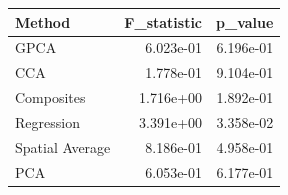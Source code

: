 \begin{tabular}{lrr}
\toprule
Method & F_statistic & p_value \\
\midrule
GPCA & 6.023e-01 & 6.196e-01 \\
CCA & 1.778e-01 & 9.104e-01 \\
Composites & 1.716e+00 & 1.892e-01 \\
Regression & 3.391e+00 & 3.358e-02 \\
Spatial Average & 8.186e-01 & 4.958e-01 \\
PCA & 6.053e-01 & 6.177e-01 \\
\bottomrule
\end{tabular}
